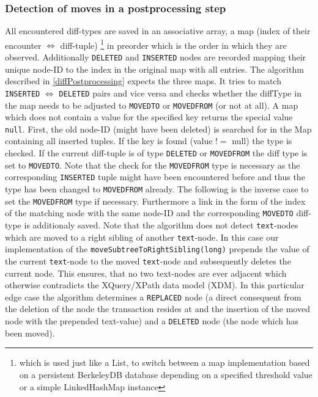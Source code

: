 \subsubsection{Detection of moves in a postprocessing step} All encountered diff-types are saved in an associative array, a map (index of their encounter $\Leftrightarrow$ diff-tuple) \footnote{which is used just like a List, to switch between a map implementation based on a persistent BerkeleyDB database depending on a specified threshold value or a simple LinkedHashMap instance} in preorder which is the order in which they are observed. Additionally \texttt{DELETED} and \texttt{INSERTED} nodes are recorded mapping their unique node-ID to the index in the original map with all entries. The algorithm described in \ref{diffPostprocessing} expects the three maps. It tries to match \texttt{INSERTED} $\Leftrightarrow$ \texttt{DELETED} pairs and vice versa and checks whether the diffType in the map needs to be adjusted to \texttt{MOVEDTO} or \texttt{MOVEDFROM} (or not at all). A map which does not contain a value for the specified key returns the special value \texttt{null}. First, the old node-ID (might have been deleted) is searched for in the Map containing all inserted tuples. If the key is found (value $!=$ null) the type is checked. If the current diff-tuple is of type \texttt{DELETED} or \texttt{MOVEDFROM} the diff type is set to \texttt{MOVEDTO}. Note that the check for the \texttt{MOVEDFROM} type is necessary as the corresponding \texttt{INSERTED} tuple might have been encountered before and thus the type has been changed to \texttt{MOVEDFROM} already. The following is the inverse case to set the \texttt{MOVEDFROM} type if necessary. Furthermore a link in the form of the index of the matching node with the same node-ID and the corresponding \texttt{MOVEDTO} diff-type is additionaly saved. Note that the algorithm does not detect \texttt{text}-nodes which are moved to a right sibling of another \texttt{text}-node. In this case our implementation of the \texttt{moveSubtreeToRightSibling(long)} prepends the value of the current \texttt{text}-node to the moved \texttt{text}-node and subsequently deletes the current node. This ensures, that no two text-nodes are ever adjacent which otherwise contradicts the XQuery/XPath data model (XDM). In this particular edge case the algorithm determines a \texttt{REPLACED} node (a direct consequent from the deletion of the node the transaction resides at and the insertion of the moved node with the prepended text-value) and a \texttt{DELETED} node (the node which has been moved).

